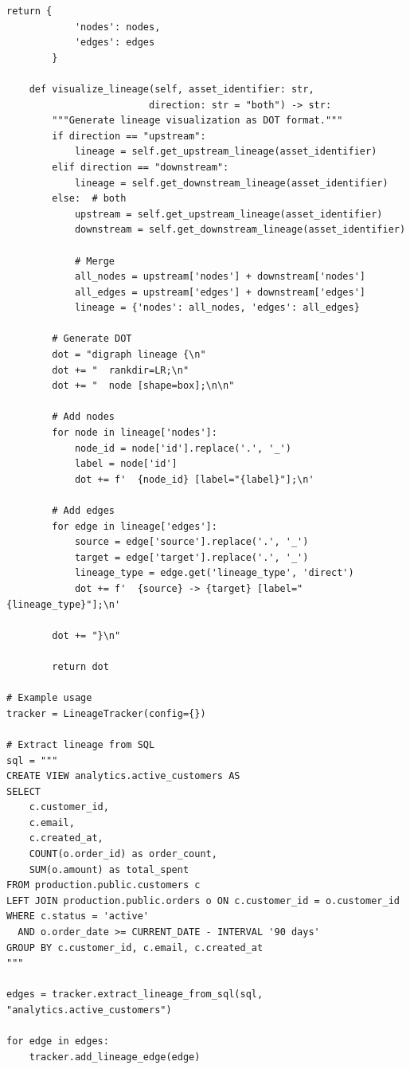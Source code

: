 \begin{lstlisting}[style=python, caption=LineageTracker with Column-Level Dependencies]
        return {
            'nodes': nodes,
            'edges': edges
        }

    def visualize_lineage(self, asset_identifier: str,
                         direction: str = "both") -> str:
        """Generate lineage visualization as DOT format."""
        if direction == "upstream":
            lineage = self.get_upstream_lineage(asset_identifier)
        elif direction == "downstream":
            lineage = self.get_downstream_lineage(asset_identifier)
        else:  # both
            upstream = self.get_upstream_lineage(asset_identifier)
            downstream = self.get_downstream_lineage(asset_identifier)

            # Merge
            all_nodes = upstream['nodes'] + downstream['nodes']
            all_edges = upstream['edges'] + downstream['edges']
            lineage = {'nodes': all_nodes, 'edges': all_edges}

        # Generate DOT
        dot = "digraph lineage {\n"
        dot += "  rankdir=LR;\n"
        dot += "  node [shape=box];\n\n"

        # Add nodes
        for node in lineage['nodes']:
            node_id = node['id'].replace('.', '_')
            label = node['id']
            dot += f'  {node_id} [label="{label}"];\n'

        # Add edges
        for edge in lineage['edges']:
            source = edge['source'].replace('.', '_')
            target = edge['target'].replace('.', '_')
            lineage_type = edge.get('lineage_type', 'direct')
            dot += f'  {source} -> {target} [label="{lineage_type}"];\n'

        dot += "}\n"

        return dot

# Example usage
tracker = LineageTracker(config={})

# Extract lineage from SQL
sql = """
CREATE VIEW analytics.active_customers AS
SELECT
    c.customer_id,
    c.email,
    c.created_at,
    COUNT(o.order_id) as order_count,
    SUM(o.amount) as total_spent
FROM production.public.customers c
LEFT JOIN production.public.orders o ON c.customer_id = o.customer_id
WHERE c.status = 'active'
  AND o.order_date >= CURRENT_DATE - INTERVAL '90 days'
GROUP BY c.customer_id, c.email, c.created_at
"""

edges = tracker.extract_lineage_from_sql(sql, "analytics.active_customers")

for edge in edges:
    tracker.add_lineage_edge(edge)


\end{lstlisting}
